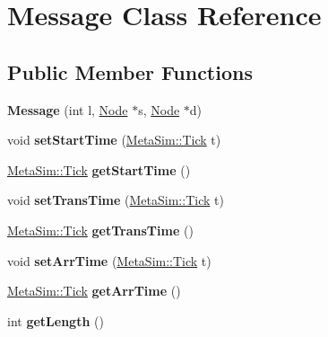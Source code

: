 \hypertarget{classMessage}{}\section{Message Class Reference}
\label{classMessage}
\subsection*{Public Member Functions}
\begin{DoxyCompactItemize}
\item 
{\bfseries Message} (int l, \hyperlink{classNode}{Node} $\ast$s, \hyperlink{classNode}{Node} $\ast$d)\hypertarget{classMessage_a1ff0a29c9549326a2e5acbc84249e92c}{}\label{classMessage_a1ff0a29c9549326a2e5acbc84249e92c}

\item 
void {\bfseries set\+Start\+Time} (\hyperlink{classMetaSim_1_1Tick}{Meta\+Sim\+::\+Tick} t)\hypertarget{classMessage_a6784d32936c60bf08059418fa0206282}{}\label{classMessage_a6784d32936c60bf08059418fa0206282}

\item 
\hyperlink{classMetaSim_1_1Tick}{Meta\+Sim\+::\+Tick} {\bfseries get\+Start\+Time} ()\hypertarget{classMessage_a5a65790ba69c8960919bf03e8d3f0e04}{}\label{classMessage_a5a65790ba69c8960919bf03e8d3f0e04}

\item 
void {\bfseries set\+Trans\+Time} (\hyperlink{classMetaSim_1_1Tick}{Meta\+Sim\+::\+Tick} t)\hypertarget{classMessage_a53c9fc52e5088b4bc38a31b6734df086}{}\label{classMessage_a53c9fc52e5088b4bc38a31b6734df086}

\item 
\hyperlink{classMetaSim_1_1Tick}{Meta\+Sim\+::\+Tick} {\bfseries get\+Trans\+Time} ()\hypertarget{classMessage_a72bc79f411f6d89aa1d849d9ea3b80b1}{}\label{classMessage_a72bc79f411f6d89aa1d849d9ea3b80b1}

\item 
void {\bfseries set\+Arr\+Time} (\hyperlink{classMetaSim_1_1Tick}{Meta\+Sim\+::\+Tick} t)\hypertarget{classMessage_a1c73c220592b4c6b9c22b349b6872d8c}{}\label{classMessage_a1c73c220592b4c6b9c22b349b6872d8c}

\item 
\hyperlink{classMetaSim_1_1Tick}{Meta\+Sim\+::\+Tick} {\bfseries get\+Arr\+Time} ()\hypertarget{classMessage_a7c8041edc7459ef588572e8033c93d56}{}\label{classMessage_a7c8041edc7459ef588572e8033c93d56}

\item 
int {\bfseries get\+Length} ()\hypertarget{classMessage_a251e53a9658b9f5baa5eac040d81c7ab}{}\label{classMessage_a251e53a9658b9f5baa5eac040d81c7ab}


\end{DoxyCompactItemize}
